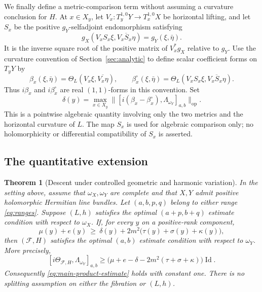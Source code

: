 \documentclass[11pt,reqno]{amsart}
\numberwithin{equation}{section}
\newtheorem{theorem}{Theorem}[section]
\theoremstyle{definition}
\theoremstyle{remark}
\newcommand{\cF}{\mathcal F}
\newcommand{\Id}{\operatorname{Id}}
\begin{document}
We finally define a metric-comparison term without assuming a curvature conclusion for $H$. At $x\in X_y$, let $V_x:T_y^{1,0}Y\to T_x^{1,0}X$ be horizontal lifting, and let $S_x$ be the positive $g_Y$-selfadjoint endomorphism satisfying
\[
 g_X(V_xS_x\xi,\overline{V_xS_x\eta})=g_Y(\xi,\bar\eta).
\]
It is the inverse square root of the positive matrix of $V_x^*g_X$ relative to $g_Y$. Use the curvature convention of Section~\ref{sec:analytic} to define scalar coefficient forms on $T_yY$ by
\[
 \beta_x(\xi,\bar\eta)=\Theta_L(V_x\xi,\overline{V_x\eta}),\qquad
 \beta_x^\circ(\xi,\bar\eta)
      =\Theta_L(V_xS_x\xi,\overline{V_xS_x\eta}).
\]
Thus $i\beta_x$ and $i\beta_x^\circ$ are real $(1,1)$-forms in this convention. Set
\begin{equation}\label{eq:metric-comparison-cost}
 \delta(y)=\max_{x\in X_y}
  \bigl\|[i(\beta_x-\beta_x^\circ),\Lambda_{\omega_Y}]_{a,b}\bigr\|_{\mathrm{op}}.
\end{equation}
This is a pointwise algebraic quantity involving only the two metrics and the horizontal curvature of $L$. The map $S_x$ is used for algebraic comparison only; no holomorphicity or differential compatibility of $S_x$ is asserted.

\subsection{The quantitative extension}
\begin{theorem}[Descent under controlled geometric and harmonic variation]\label{thm:fibration-descent}
In the setting above, assume that $\omega_X,\omega_Y$ are complete and that $X,Y$ admit positive holomorphic Hermitian line bundles. Let $(a,b,p,q)$ belong to either range \eqref{eq:ranges}. Suppose $(L,h)$ satisfies the optimal $(a+p,b+q)$ estimate condition with respect to $\omega_X$. If, for every $y$ on a positive-rank component,
\begin{equation}\label{eq:fibration-budget}
 \boxed{\quad
 \mu(y)+e(y)\ \geq\
 \delta(y)+2m^2\bigl(\tau(y)+\sigma(y)+\kappa(y)\bigr),
 \quad}
\end{equation}
then $(\cF,H)$ satisfies the optimal $(a,b)$ estimate condition with respect to $\omega_Y$. More precisely,
\begin{equation}\label{eq:fibration-curvature-bound}
 [i\Theta_{\cF,H},\Lambda_{\omega_Y}]_{a,b}
 \geq\bigl(\mu+e-\delta-2m^2(\tau+\sigma+\kappa)\bigr)\Id.
\end{equation}
Consequently \eqref{eq:main-product-estimate} holds with constant one. There is no splitting assumption on either the fibration or $(L,h)$.
\end{theorem}
\end{document}
